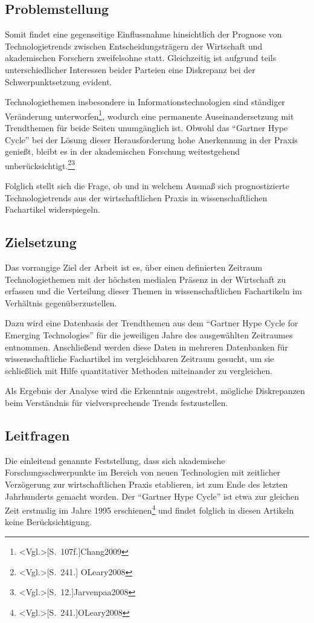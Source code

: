 \subsection{Problemstellung}
Somit findet eine gegenseitige Einflussnahme hinsichtlich der Prognose von Technologietrends zwischen Entscheidungsträgern der Wirtschaft und akademischen Forschern zweifelsohne statt. Gleichzeitig ist aufgrund teils unterschiedlicher Interessen beider Parteien eine Diskrepanz bei der Schwerpunktsetzung evident. 

Technologiethemen insbesondere in Informationstechnologien sind ständiger Ver\-änderung unterworfen\footnote{\citeNP<Vgl.>[S.~107f.]{Chang2009}}, wodurch eine permanente Auseinandersetzung mit Trend\-themen für beide Seiten unumgänglich ist. Obwohl das "`Gartner Hype Cycle"' bei der Lösung dieser Herausforderung hohe Anerkennung in der Praxis genießt, bleibt es in der akademischen Forschung weitestgehend unberücksichtigt.\footnote{\citeNP<Vgl.>[S.~241.] {OLeary2008}}\footnote{\citeNP<Vgl.>[S.~12.]{Jarvenpaa2008}}

Folglich stellt sich die Frage, ob und in welchem Ausmaß sich prognostizierte Technologietrends aus der wirtschaftlichen Praxis in wissenschaftlichen Fachartikel widerspiegeln.

\subsection{Zielsetzung}
Das vorrangige Ziel der Arbeit ist es, über einen definierten Zeitraum Technologiethemen mit der höchsten medialen Präsenz in der Wirtschaft zu erfassen und die Verteilung dieser Themen in wissenschaftlichen Fachartikeln im Verhältnis gegenüberzustellen.

Dazu wird eine Datenbasis der Trendthemen aus dem "`Gartner Hype Cycle for Emerging Technologies"' für die jeweiligen Jahre des ausgewählten Zeitraumes entnommen. Anschließend werden diese Daten in mehreren Datenbanken für wissenschaftliche Fachartikel im vergleichbaren Zeitraum gesucht, um sie schließlich mit Hilfe quantitativer Methoden miteinander zu vergleichen.

Als Ergebnis der Analyse wird die Erkenntnis angestrebt, mögliche Diskrepanzen beim Verständnis für vielversprechende Trends festzustellen.

\subsection{Leitfragen}
Die einleitend genannte Feststellung, dass sich akademische Forschungsschwerpunkte im Bereich von neuen Technologien mit zeitlicher Verzögerung zur wirtschaftlichen Praxis etablieren, ist zum Ende des letzten Jahrhunderts gemacht worden. Der "`Gartner Hype Cycle"' ist etwa zur gleichen Zeit erstmalig im Jahre 1995 erschienen\footnote{\citeNP<Vgl.>[S.~241.]{OLeary2008}} und findet folglich in diesen Artikeln keine Berücksichtigung.


